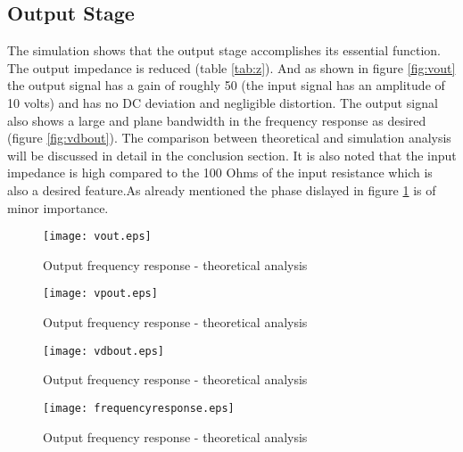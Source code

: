 \newpage
\subsection{Output Stage}

The simulation shows that the output stage accomplishes its essential function. The output impedance is reduced (table \ref{tab:z}). And as shown in figure \ref{fig:vout} the output signal has a gain of roughly 50 (the input signal has an amplitude of 10 volts) and has no DC deviation and negligible distortion. The output signal also shows a large and plane bandwidth in the frequency response as desired (figure \ref{fig:vdbout}). The comparison between theoretical and simulation analysis will be discussed in detail in the conclusion section. It is also noted that the input impedance is high compared to the 100 Ohms of the input resistance which is also a desired feature.As already mentioned the phase dislayed in figure \ref{fig:vpout} is of minor importance.


\begin{figure}[h] \centering
  \begin{minipage}{.45\textwidth}
    \texttt{[image: vout.eps]}
    \caption{Output frequency response - theoretical analysis}
    \label{fig:vout}
  \end{minipage}%
    \hspace{2 mm}
  \begin{minipage}{.45\textwidth}
  \centering
    \texttt{[image: vpout.eps]}
    \caption{Output frequency response - theoretical analysis}
    \label{fig:vpout}
      \end{minipage}%
\end{figure}


\begin{figure}[h] \centering
  \begin{minipage}{.45\textwidth}
    \texttt{[image: vdbout.eps]}
    \caption{Output frequency response - theoretical analysis}
    \label{fig:vdbout}
  \end{minipage}%
    \hspace{2 mm}
  \begin{minipage}{.45\textwidth}
  \centering
    \texttt{[image: frequencyresponse.eps]}
    \caption{Output frequency response - theoretical analysis}
    \label{fig:compvdbout}
      \end{minipage}%
\end{figure}

